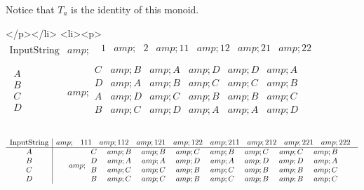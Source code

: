 Notice that \(T_a\) is the identity of this monoid.

</p></li>
<li><p>   \(\begin{array}{c|c}
 \text{Input} \text{String} &amp; 
\begin{array}{cccccc}
 \text{   }1 &amp; \text{  }2  &amp;  11 &amp; 12 &amp; 21 &amp; 22 \\
\end{array}
 \\
\hline
 
\begin{array}{c}
 A \\
 B \\
 C \\
 D \\
\end{array}
 &amp; 
\begin{array}{cccccc}
 C &amp; B &amp; A &amp; D &amp; D &amp; A \\
 D &amp; A &amp; B &amp; C &amp; C &amp; B\text{} \\
 A\text{} &amp; D\text{} &amp; C\text{} &amp; B &amp; B &amp; C \\
 B &amp; C &amp; D &amp; A &amp; A &amp; D \\
\end{array}
 \\
\end{array}\)



        \(\begin{array}{c|c}
 \text{Input} \text{String} &amp; 
\begin{array}{cccccccc}
 \text{   }111 &amp; 112 &amp; 121 &amp; 122 &amp; 211\text{\textit{$ $}} &amp; 212 &amp; 221 &amp; 222 \\
\end{array}
 \\
\hline
 
\begin{array}{c}
 A \\
 B \\
 C \\
 D \\
\end{array}
 &amp; 
\begin{array}{cccccccc}
 C\text{     } &amp; B\text{     } &amp; B\text{     } &amp; C\text{     } &amp; B\text{     } &amp; C\text{     } &amp; C\text{    } &amp; B \\
 D\text{    } &amp; A\text{    } &amp; A\text{     } &amp;  D\text{    } &amp; A\text{    } &amp; D\text{     } &amp; D\text{   } &amp; A \\
 B\text{    } &amp; C\text{    } &amp; C\text{    } &amp; B\text{   } &amp; C\text{    } &amp; B\text{    } &amp; B\text{   } &amp; C \\
 B\text{    } &amp; C\text{    } &amp; C\text{    } &amp; B\text{   } &amp; C\text{    } &amp; B\text{    } &amp; B\text{   } &amp; C \\
\end{array}
 \\
\end{array}\)



